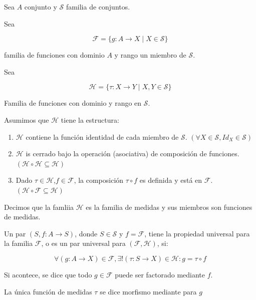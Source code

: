 \begin{defn}
	Sea $A$ conjunto y $\mathcal{S}$ familia de conjuntos. 
	
	Sea 
	
	\begin{equation*}
		\mathcal{F} = \{g : A \to X \mid X \in \mathcal{S} \}
	\end{equation*}
	
	familia de funciones con dominio $A$ y rango un miembro de $\mathcal{S}$.
	
	Sea 
	
	\begin{equation*}
		\mathcal{H} = \{\tau : X \to Y \mid X,Y \in \mathcal{S} \}  
	\end{equation*}
	
	Familia de funciones con dominio y rango en $\mathcal{S}$. 
	
	Asumimos que $\mathcal{H}$ tiene la estructura:
	
	\begin{enumerate}
		\item $\mathcal{H}$ contiene la función identidad de cada miembro de $\mathcal{S}$. $(\forall X \in \mathcal{S}, Id_X \in \mathcal{S})$
		\item $\mathcal{H}$ is cerrado bajo la operación  (asociativa) de composición de funciones.$( \mathcal{H} \circ \mathcal{H} \subseteq \mathcal{H})$
		\item Dado $\tau\in \mathcal{H}$,$f\in \mathcal{F}$, la composición $\tau \circ f$ es definida y está en $\mathcal{F}$. $( \mathcal{H} \circ \mathcal{F} \subseteq \mathcal{H})$
	\end{enumerate}
	
	
	
	Decimos que la famliia $\mathcal{H}$ es la familia de medidas y sus miembros son funciones de medidas.
	
	Un par $(S, f:A\to S)$, donde  $S \in \mathcal{S}$ y $f = \mathcal{F}$, tiene la propiedad universal para la familia $\mathcal{F}$, o es un par universal para $(\mathcal{F},\mathcal{H})$, si:
	
	
	\begin{equation*}
		\forall (g : A\to X) \in \mathcal{F}, \exists ! (\tau : S\to X )\in \mathcal{H}: g = \tau  \circ f
	\end{equation*} 
	
	Si acontece, se dice que todo $g \in \mathcal{F}$ puede ser factorado mediante $f$.
	
	La única función de medidas $\tau$ se dice morfismo mediante para $g$
	
	
\end{defn}

